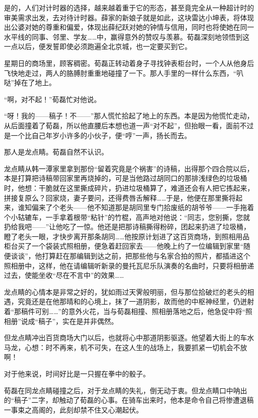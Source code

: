 \par 是的，人们对计时器的选择，越来越着重于它的形态，甚至竟完全从一种超计时的审美需求出发，去对待计时器。薛家的新娘子就是如此，这块雷达小坤表，将体现出公婆对她的尊重和偏爱，体现出薛纪跃对她的钟情与信用，同时也将使她在同一水平线的同事、邻里、学友……中，赢得意外的赞叹与羡慕。荀磊深刻地领悟到这一点以后，便发誓即使必须跑遍全北京城，也一定要买到它。
\par 星期日的商场里，顾客稠密。荀磊正转动着身子寻找钟表柜台时，一个人从他身后飞快地走过，两人的胳膊肘重重地碰撞了一下。那人手里的一样什么东西，“叭哒”掉在了地上。
\par “啊，对不起！”荀磊忙对他说。
\par “呀！我的——稿子！不——”那人慌忙拾起了地上的东西。本是因为他慌忙走动，从后面撞着了荀磊，所以他直腰后本想也道一声“对不起”，但抬眼一看，面前不过是一个比自己年岁小许多的小伙子，便“哼”一声，扬长而去。
\par 那人是龙点睛。荀磊自然不认识。
\par 龙点睛从韩一潭家里拿到那份“留着究竟是个祸害”的诗稿，出得那个四合院以后，本是打算把诗稿带回家里再烧掉的，可是当他路过胡同口的那排浅绿色的垃圾桶时，他想：干脆就在这里撕成碎片，扔进垃圾桶算了，难道还会有人把它拣起来，拼接复原么？回家烧，妻子要问，还得费唇舌解释……于是，他便在那里撕将起来，谁知偏来了个老头——他不知道那是胡同里专门拾废纸的胡爷爷——一手拖着个小轱辘车，一手拿着根带“粘针”的竹棍，高声地对他说：“同志，您别撕，您就扔给我吧——”让他吃了一惊。他还是把那诗稿撕得粉碎，团起来扔进了垃圾桶，瞪了老头一眼，才快步离开那条胡同……他按原计划进了这百货商场，到照相用品柜台买了一个袋装式照相册，便急着赶回家去——他晚上约了一位编辑到家里“随便谈谈”，他打算赶在那编辑到达之前，把那些他与名家合拍的照片，都插进这个照相册中，这样，他在请编辑听新录的曼托瓦尼乐队演奏的名曲时，只要将相册递过去，使能坐收“尽在不言中”的效果……
\par 龙点睛的心情本是非常之好的，犹如雨过天霁般明丽，但与那位拾破烂的老头的相遇，究竟还是在他那晴和的心境上，抹了一道阴影，故而他的中枢神经里，仍迸射着“那稿件可别……”的意外火花，当与荀磊相撞、照相册落地之后，他急促中将“照相册”说成“稿子”，实在是并非偶然。
\par 但龙点睛冲出百货商场大门以后，也就将心中那道阴影驱逐。他望着大街上的车水马龙，心想：时不再来，机不可失，在这人生的战场上，我要抓紧一切机会不放啊！
\par 对于他来说，时间好比是一只握在拳中的骰子。
\par 荀磊在同龙点睛碰撞之后，对于龙点睛的失礼，倒无动于衷。但龙点睛口中呐出的“稿子”二字，却触动了荀磊的心事。在骑车出来时，他本是命令自己将惨遭退稿一事束之高阁的，此刻却禁不住又心潮起伏。
